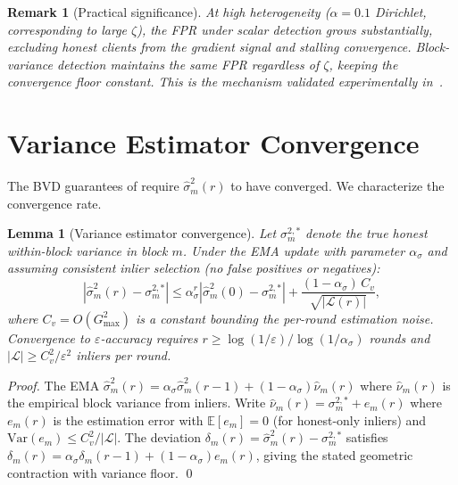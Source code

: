 \documentclass{article}
\newtheorem{lemma}[theorem]{Lemma}
\newtheorem{remark}{Remark}
\newcommand{\E}{\mathbb{E}}
\newcommand{\calL}{\mathcal{L}}
\begin{document}
\begin{remark}[Practical significance]
At high heterogeneity ($\alpha = 0.1$ Dirichlet, corresponding to large $\zeta$),
the FPR under scalar detection grows substantially, excluding honest clients
from the gradient signal and stalling convergence.
Block-variance detection maintains the same FPR regardless of $\zeta$,
keeping the convergence floor constant.
This is the mechanism validated experimentally in~.
\end{remark}

\section{Variance Estimator Convergence}
\label{sec:var_convergence}

The BVD guarantees of  require $\hat\sigma_m^2(r)$
to have converged.
We characterize the convergence rate.

\begin{lemma}[Variance estimator convergence]
\label{lem:var_convergence}
Let $\sigma_m^{2,*}$ denote the true honest within-block variance in block $m$.
Under the EMA update with parameter $\alpha_\sigma$ and assuming consistent
inlier selection (no false positives or negatives):
\[
  |\hat\sigma_m^2(r) - \sigma_m^{2,*}|
  \leq
  \alpha_\sigma^r |\hat\sigma_m^2(0) - \sigma_m^{2,*}|
  + \frac{(1-\alpha_\sigma)\,C_v}{\sqrt{|\calL(r)|}},
\]
where $C_v = O(G_{\max}^2)$ is a constant bounding the per-round estimation noise.
Convergence to $\varepsilon$-accuracy requires
$r \geq \log(1/\varepsilon)/\log(1/\alpha_\sigma)$ rounds and
$|\calL| \geq C_v^2 / \varepsilon^2$ inliers per round.
\end{lemma}

\begin{proof}
The EMA $\hat\sigma_m^2(r) = \alpha_\sigma \hat\sigma_m^2(r-1)
+ (1-\alpha_\sigma)\hat\nu_m(r)$ where $\hat\nu_m(r)$ is the empirical
block variance from inliers.
Write $\hat\nu_m(r) = \sigma_m^{2,*} + e_m(r)$ where $e_m(r)$ is the
estimation error with $\E[e_m] = 0$ (for honest-only inliers) and
$\mathrm{Var}(e_m) \leq C_v^2 / |\calL|$.
The deviation $\delta_m(r) = \hat\sigma_m^2(r) - \sigma_m^{2,*}$
satisfies $\delta_m(r) = \alpha_\sigma \delta_m(r-1) + (1-\alpha_\sigma)e_m(r)$,
giving the stated geometric contraction with variance floor.
\qed
\end{proof}
\end{document}
